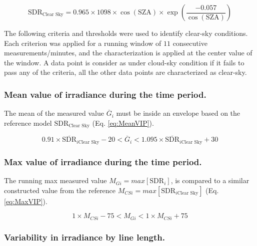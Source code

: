 \documentclass[
  preprint, 3p, authoryear]{article}
\begin{document}
\begin{equation}
\text{SDR}_\text{Clear Sky} = 0.965 \times 1098 \times \cos( \text{SZA} ) \times \exp \left( \frac{ - 0.057}{\cos(\text{SZA})} \right) \label{eq:ahau}
\end{equation}

The following criteria and thresholds were used to identify clear-sky conditions.
Each criterion was applied for a running window of \(11\) consecutive measurements/minutes, and the characterization is applied at the center value of the window.
A data point is consider as under cloud-sky condition if it fails to pass any of the criteria, all the other data points are characterized as clear-sky.

\hypertarget{mean-value-of-irradiance-during-the-time-period.}{%
\subsubsection{Mean value of irradiance during the time period.}\label{mean-value-of-irradiance-during-the-time-period.}}

The mean of the measured value \(\overline{G}_i\) must be inside an envelope based on the reference model \(\text{SDR}_\text{Clear Sky}\) (Eq. \ref{eq:MeanVIP}).

\begin{equation}
0.91 \times \overline{\text{SDR}}_{i\text{Clear Sky}} - 20
< \overline{G}_i <
1.095 \times \overline{\text{SDR}}_{i\text{Clear Sky}} + 30
\label{eq:MeanVIP}
\end{equation}

\hypertarget{max-value-of-irradiance-during-the-time-period.}{%
\subsubsection{Max value of irradiance during the time period.}\label{max-value-of-irradiance-during-the-time-period.}}

The running max measured value \(M_{Gi} = max[\text{SDR}_{i}]\), is compared to a similar constructed value from the reference \(M_{CSi} = max[\text{SDR}_{i\text{Clear Sky}}]\) (Eq. \ref{eq:MaxVIP}).

\begin{equation}
1 \times M_{CSi} - 75
< M_{Gi} <
1 \times M_{CSi} + 75
\label{eq:MaxVIP}
\end{equation}

\hypertarget{variability-in-irradiance-by-line-length.}{%
\subsubsection{Variability in irradiance by line length.}\label{variability-in-irradiance-by-line-length.}}
\end{document}
